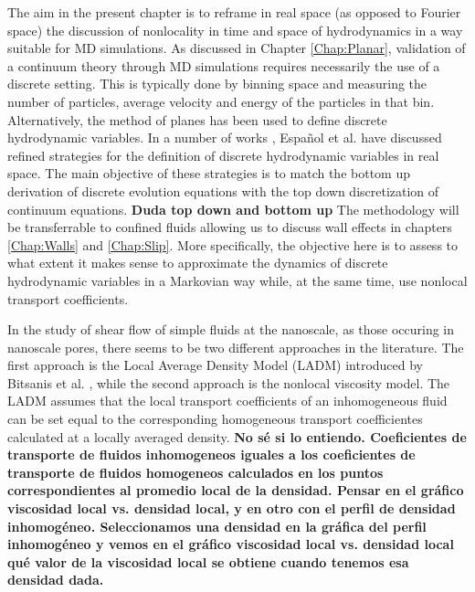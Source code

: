 \documentclass[b5paper,openright,10pt]{book}
\newcommand{\Note}[1]{{\bf \color{red}#1}}    %
\begin{document}
The aim in the present chapter is to reframe in  real space (as opposed
to Fourier space) the discussion of  nonlocality in time and space of
hydrodynamics in  a way suitable  for MD simulations. As  discussed in
Chapter \ref{Chap:Planar},  validation of  a continuum  theory
through  MD simulations  requires necessarily  the use  of a  discrete
setting.  This  is typically done  by binning space and  measuring the
number of particles,  average velocity and energy of  the particles in
that     bin.      Alternatively,     the     method     of     planes
\cite{Davis1996,Travis2000}   has  been   used   to  define   discrete
hydrodynamic     variables.      In      a     number     of     works
\cite{Espanol2009i,DelaTorre2011,DelaTorre2015,EspanolDonev2015},   Español et al.
have  discussed  refined strategies  for  the  definition of  discrete
hydrodynamic variables  in real  space.  The  main objective  of these
strategies is to match the  bottom up derivation of discrete evolution
equations with the top down  discretization of continuum equations. \Note{Duda top down and bottom up}
The  methodology will be  transferrable to
confined fluids allowing  us to discuss wall  effects in chapters \ref{Chap:Walls} and \ref{Chap:Slip}.  More  specifically, the
objective  here  is  to  assess  to what  extent  it  makes  sense  to
approximate  the  dynamics of  discrete  hydrodynamic  variables in  a
Markovian  way  while,  at  the same  time,  use  nonlocal  transport
coefficients. 

In the study of shear flow of simple fluids at the nanoscale, as those
occuring  in  nanoscale  pores,  there   seems  to  be  two  different
approaches in the literature.  The first approach is the Local Average
Density Model  (LADM) introduced by Bitsanis  et al.  \cite{Bitsanis1987},
while the second  approach is the nonlocal viscosity  model. 
The LADM assumes that the local transport coefficients of an inhomogeneous
fluid can be set equal to the corresponding homogeneous transport coefficientes calculated at a locally averaged density. 
\Note{No sé si lo entiendo. Coeficientes de transporte de fluidos inhomogeneos iguales a los coeficientes de transporte de fluidos homogeneos calculados en los puntos correspondientes al promedio local de la densidad. Pensar en el gráfico viscosidad local vs. densidad local, y en otro con el perfil de densidad inhomogéneo. Seleccionamos una densidad en la gráfica del perfil inhomogéneo y vemos en el gráfico viscosidad local vs. densidad local qué valor de la viscosidad local se obtiene cuando tenemos esa densidad dada.}
\end{document}
